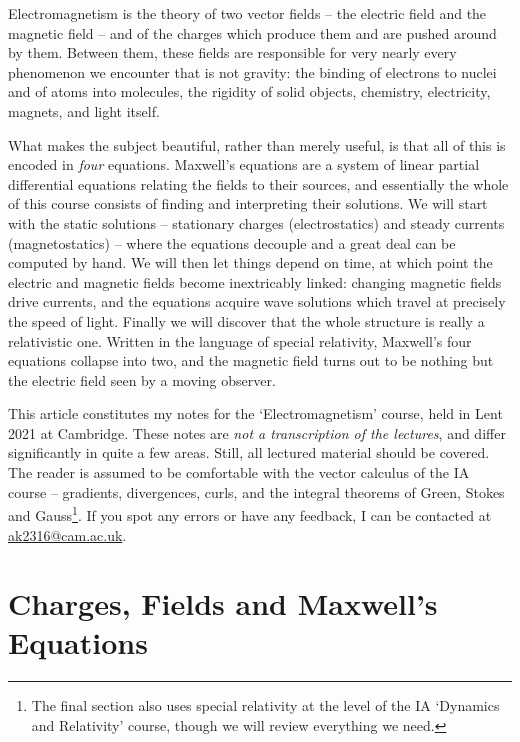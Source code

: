 



Electromagnetism is the theory of two vector fields -- the electric field and the magnetic field -- and of the charges which produce them and are pushed around by them. Between them, these fields are responsible for very nearly every phenomenon we encounter that is not gravity: the binding of electrons to nuclei and of atoms into molecules, the rigidity of solid objects, chemistry, electricity, magnets, and light itself.

What makes the subject beautiful, rather than merely useful, is that all of this is encoded in \emph{four} equations. Maxwell's equations are a system of linear partial differential equations relating the fields to their sources, and essentially the whole of this course consists of finding and interpreting their solutions. We will start with the static solutions -- stationary charges (electrostatics) and steady currents (magnetostatics) -- where the equations decouple and a great deal can be computed by hand. We will then let things depend on time, at which point the electric and magnetic fields become inextricably linked: changing magnetic fields drive currents, and the equations acquire wave solutions which travel at precisely the speed of light. Finally we will discover that the whole structure is really a relativistic one. Written in the language of special relativity, Maxwell's four equations collapse into two, and the magnetic field turns out to be nothing but the electric field seen by a moving observer.

This article constitutes my notes for the `Electromagnetism' course, held in Lent 2021 at Cambridge. These notes are \emph{not a transcription of the lectures}, and differ significantly in quite a few areas. Still, all lectured material should be covered. The reader is assumed to be comfortable with the vector calculus of the IA course -- gradients, divergences, curls, and the integral theorems of Green, Stokes and Gauss\footnote{The final section also uses special relativity at the level of the IA `Dynamics and Relativity' course, though we will review everything we need.}. If you spot any errors or have any feedback, I can be contacted at \href{mailto:ak2316@cam.ac.uk}{ak2316@cam.ac.uk}.



\section{Charges, Fields and Maxwell's Equations}

